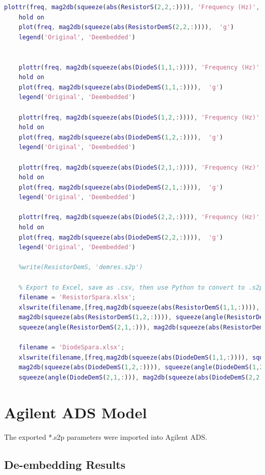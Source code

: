 \documentclass{article} %
\begin{document}
\begin{lstlisting}[language=Matlab, caption=De-embedding with RF Toolbox]
	plottr(freq, mag2db(squeeze(abs(ResistorS(2,2,:)))), 'Frequency (Hz)', '|S22|', 'Resistor S22')
	hold on
	plot(freq, mag2db(squeeze(abs(ResistorDemS(2,2,:)))),  'g')
	legend('Original', 'Deembedded')
	
	
	plottr(freq, mag2db(squeeze(abs(DiodeS(1,1,:)))), 'Frequency (Hz)', '|S11|', 'Diode S11')
	hold on
	plot(freq, mag2db(squeeze(abs(DiodeDemS(1,1,:)))),  'g')
	legend('Original', 'Deembedded')
	
	plottr(freq, mag2db(squeeze(abs(DiodeS(1,2,:)))), 'Frequency (Hz)', '|S12|', 'Diode S12')
	hold on
	plot(freq, mag2db(squeeze(abs(DiodeDemS(1,2,:)))),  'g')
	legend('Original', 'Deembedded')
	
	plottr(freq, mag2db(squeeze(abs(DiodeS(2,1,:)))), 'Frequency (Hz)', '|S21|', 'Diode S21')
	hold on
	plot(freq, mag2db(squeeze(abs(DiodeDemS(2,1,:)))),  'g')
	legend('Original', 'Deembedded')
	
	plottr(freq, mag2db(squeeze(abs(DiodeS(2,2,:)))), 'Frequency (Hz)', '|S22|', 'Diode S22')
	hold on
	plot(freq, mag2db(squeeze(abs(DiodeDemS(2,2,:)))),  'g')
	legend('Original', 'Deembedded')
	
	%write(ResistorDemS, 'demres.s2p')
	
	% Export to Excel, save as .csv, then use Python to convert to .s2p
	filename = 'ResistorSpara.xlsx';
	xlswrite(filename,[freq,mag2db(squeeze(abs(ResistorDemS(1,1,:)))), squeeze(angle(ResistorDemS(1,1,:))), ...
	mag2db(squeeze(abs(ResistorDemS(1,2,:)))), squeeze(angle(ResistorDemS(1,2,:))), mag2db(squeeze(abs(ResistorDemS(2,1,:)))), ...
	squeeze(angle(ResistorDemS(2,1,:))), mag2db(squeeze(abs(ResistorDemS(2,2,:)))), squeeze(angle(ResistorDemS(2,2,:)))]);
	
	filename = 'DiodeSpara.xlsx';
	xlswrite(filename,[freq,mag2db(squeeze(abs(DiodeDemS(1,1,:)))), squeeze(angle(DiodeDemS(1,1,:))), ...
	mag2db(squeeze(abs(DiodeDemS(1,2,:)))), squeeze(angle(DiodeDemS(1,2,:))), mag2db(squeeze(abs(DiodeDemS(2,1,:)))), ...
	squeeze(angle(DiodeDemS(2,1,:))), mag2db(squeeze(abs(DiodeDemS(2,2,:)))), squeeze(angle(DiodeDemS(2,2,:)))]);
	\end{lstlisting}
	
	\newpage{}
	
	\section{Agilent ADS Model}
	The exported *.s2p parameters were imported into Agilent ADS.
	
	\subsection{De-embedding Results}
\end{document}
